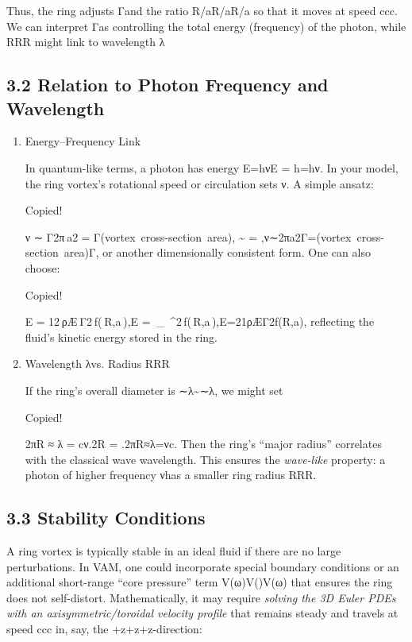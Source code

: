 Thus, the ring adjusts Γ and the ratio R/aR/aR/a so that it moves at speed ccc. We can interpret Γ as controlling the total energy (frequency) of the photon, while RRR might link to wavelength λ


\subsection*{3.2 Relation to Photon Frequency and Wavelength}

\begin{enumerate}

\item
Energy–Frequency Link

In quantum-like terms, a photon has energy E=hνE = h\nuE=hν. In your model, the ring vortex’s rotational speed or circulation sets ν. A simple ansatz:


Copied!

ν  ∼  Γ2π a2  =  Γ(vortex cross-section area),\nu
\;\sim\;
\;=\;
,ν∼2πa2Γ​=(vortex cross-section area)Γ​,
or another dimensionally consistent form. One can also choose:


Copied!

E  =  12 ρÆ Γ2 f( R,a ),E
\;=\;
\,\rho_{\scriptscriptstyle {}}
\,\Gamma^2\,f(\,R,a\,),E=21​ρÆ​Γ2f(R,a),
reflecting the fluid’s kinetic energy stored in the ring.




\item
Wavelength λ vs. Radius RRR

If the ring’s overall diameter is ∼λ\sim \lambda∼λ, we might set


Copied!

2πR  ≈  λ  =  cν.2\pi R
\;\approx\;
\lambda
\;=\;
.2πR≈λ=νc​.
Then the ring’s “major radius” correlates with the classical wave wavelength. This ensures the \textit{wave-like} property: a photon of higher frequency ν has a smaller ring radius RRR.


\end{enumerate}


\subsection*{3.3 Stability Conditions}

A ring vortex is typically stable in an ideal fluid if there are no large perturbations. In VAM, one could incorporate special boundary conditions or an additional short-range “core pressure” term V(ω)V(\boldsymbol{\omega})V(ω) that ensures the ring does not self-distort. Mathematically, it may require \textit{solving the 3D Euler PDEs with an axisymmetric/toroidal velocity profile} that remains steady and travels at speed ccc in, say, the +z+z+z-direction:



